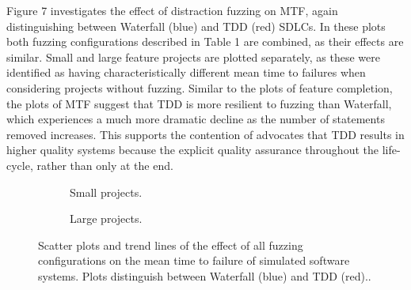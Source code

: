 \documentclass{llncs}
\begin{document}
Figure 7 investigates the effect of distraction fuzzing on MTF, again distinguishing between Waterfall (blue) and TDD
(red) SDLCs.  In these plots both fuzzing configurations described in Table 1 are combined, as their effects are
similar.  Small and large feature projects are plotted separately, as these were identified as having characteristically
different mean time to failures when considering projects without fuzzing.  Similar to the plots of feature completion,
the plots of MTF suggest that TDD is more resilient to fuzzing than Waterfall, which experiences a much more dramatic
decline as the number of statements removed increases.  This supports the contention of advocates that TDD results in
higher quality systems because the explicit quality assurance throughout the life-cycle, rather than only at the end.


\begin{figure}
  \centering
  \begin{subfigure}{2.3in}
    \caption{Small projects.}
  \end{subfigure}
  \hfill
  \begin{subfigure}{2.3in}
    \caption{Large projects.}  
  \end{subfigure}
  
  \caption{Scatter plots and trend lines of the effect of all fuzzing configurations on the mean time to failure of
    simulated software systems.  Plots distinguish between Waterfall (blue) and TDD (red)..}
  \label{fig:fuzzing-mtf}
\end{figure}
 
\end{document}
